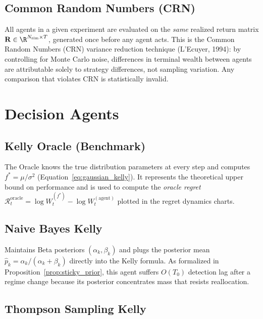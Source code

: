 \subsection{Common Random Numbers (CRN)}

All agents in a given experiment are evaluated on the \emph{same} realized
return matrix $\mathbf{R} \in \R^{N_{\text{sim}} \times T}$, generated once
before any agent acts.  This is the Common Random Numbers (CRN) variance
reduction technique (L'Ecuyer, 1994): by controlling for Monte Carlo noise,
differences in terminal wealth between agents are attributable solely to
strategy differences, not sampling variation.  Any comparison that violates
CRN is statistically invalid.

\section{Decision Agents}

\subsection{Kelly Oracle (Benchmark)}

The Oracle knows the true distribution parameters at every step and computes
$f^* = \mu/\sigma^2$ (Equation~\eqref{eq:gaussian_kelly}).  It represents the
theoretical upper bound on performance and is used to compute the \emph{oracle
regret} $\mathcal{R}_t^{\text{oracle}} = \log W_t^{(f^*)} - \log W_t^{(\text{agent})}$
plotted in the regret dynamics charts.

\subsection{Naive Bayes Kelly}

Maintains Beta posteriors $(\alpha_k, \beta_k)$ and plugs the posterior mean
$\hat p_k = \alpha_k / (\alpha_k + \beta_k)$ directly into the Kelly formula.
As formalized in Proposition~\ref{prop:sticky_prior}, this agent suffers
$O(T_0)$ detection lag after a regime change because its posterior
concentrates mass that resists reallocation.

\subsection{Thompson Sampling Kelly}

